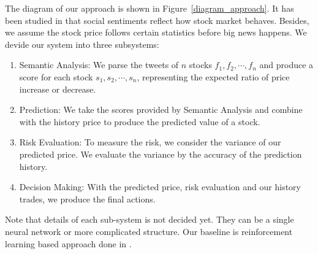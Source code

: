 \documentclass[a4paper, 11pt]{article}
\begin{document}
\begin{spacing}{1}
    The diagram of our approach is shown in Figure~\ref{diagram_approach}. It has been studied in \cite{social_relation_sentiment_analysis} that social sentiments reflect how stock market behaves. Besides, we assume the stock price follows certain statistics before big news happens. We devide our system into three subsystems:
    \begin{enumerate}
      \item Semantic Analysis: We parse the tweets of $n$ stocks $f_1, f_2, \cdots, f_n$ and produce a score for each stock $s_1, s_2, \cdots, s_n$, representing the expected ratio of price increase or decrease.
      \item Prediction: We take the scores provided by Semantic Analysis and combine with the history price to produce the predicted value of a stock.
      \item Risk Evaluation: To measure the risk, we consider the variance of our predicted price. We evaluate the variance by the accuracy of the prediction history.
      \item Decision Making: With the predicted price, risk evaluation and our history trades, we produce the final actions.
    \end{enumerate}
    Note that details of each sub-system is not decided yet. They can be a single neural network or more complicated structure. Our baseline is reinforcement learning based approach done in \cite{cs229_stanford_trading, cs229_stanford_portfolio}.
%    
%    
%    
  
  \end{spacing}  
  
  
\end{document}
